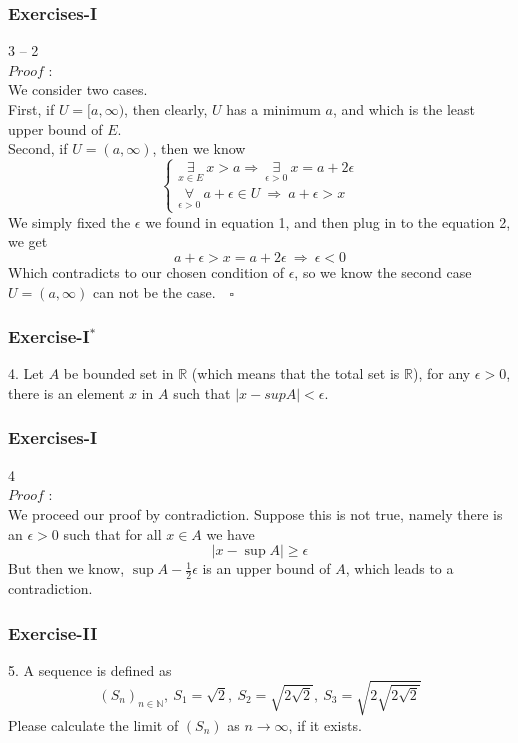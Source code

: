 \documentclass[12pt, t]{beamer}
\begin{document}
\begin{frame}
    \frametitle{Exercises-I}
3 -- 2\\
$Proof$ : \\
We consider two cases.\\
First, if $U=[a,\infty)$, then clearly, $U$ has a minimum $a$, and which is the least upper bound of $E$.\\
Second, if $U=(a,\infty)$, then we know
\begin{equation*}
    \begin{cases}
        \underset{x\in E}{\exists}\ x>a\Rightarrow\ \underset{\epsilon>0}{\exists}\ x=a+2\epsilon\\
        \underset{\epsilon>0}{\forall}\ a+\epsilon\in U\ \Rightarrow\ a+\epsilon>x
    \end{cases}
\end{equation*}
We simply fixed the $\epsilon$ we found in equation 1, and then plug in to the equation 2, we get 
\begin{equation*}
    a+\epsilon>x=a+2\epsilon\ \Rightarrow\ \epsilon<0
\end{equation*}
Which contradicts to our chosen condition of $\epsilon$, so we know the second case $U=(a,\infty)$ can not be the case.$\quad\square$

\end{frame}


\begin{frame}
    \frametitle{Exercise-I$^*$}
4. Let $A$ be bounded set in $\mathbb{R}$ (which means that the total set is $\mathbb{R}$), for any $\epsilon>0$, 
there is an element $x$ in $A$ such that $|x-supA|<\epsilon$.
\end{frame}

\begin{frame}
    \frametitle{Exercises-I}
4\\
$Proof$ : \\
\hspace{1em} We proceed our proof by contradiction. Suppose this is not true, namely there is an $\epsilon>0$ such 
that for all $x\in A$ we have 
\begin{equation*}
    |x-\sup A|\geq \epsilon
\end{equation*}
But then we know, $\sup A-\frac{1}{2}\epsilon$ is an upper bound of $A$, which leads to a contradiction.
\end{frame}

\begin{frame}
    \frametitle{Exercise-II}
5. A sequence is defined as
\begin{equation*}
    (S_n)_{n\in\mathbb{N}},\ S_1=\sqrt{2},\ S_2=\sqrt{2\sqrt{2}},\ S_3=\sqrt{2\sqrt{2\sqrt{2}}}
\end{equation*}
Please calculate the limit of $(S_n)$ as $n\rightarrow \infty$, if it exists.
\end{frame}
\end{document}
